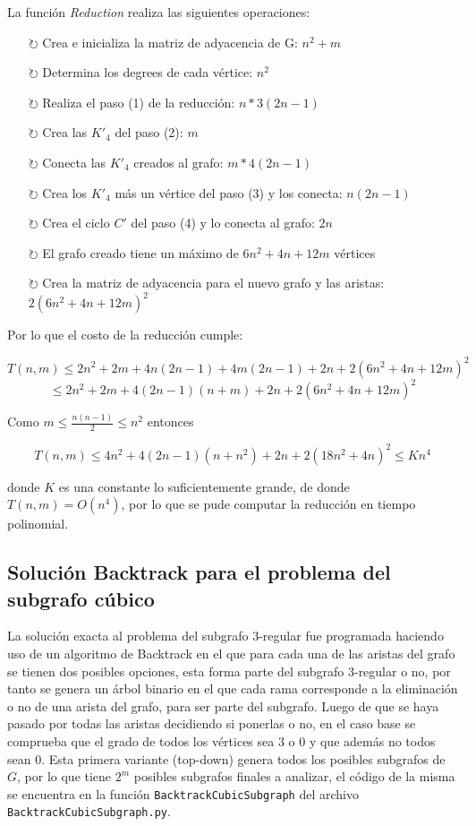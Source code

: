 \documentclass{article}
\begin{document}
La funci\'on \textit{Reduction} realiza las siguientes operaciones: 

\begin{itemize}
    \item[$\circlearrowright $] Crea e inicializa la matriz de adyacencia de G: $n^2 + m$
    \item[$\circlearrowright $] Determina los degrees de cada v\'ertice: $n^2$
    \item[$\circlearrowright $] Realiza el paso (1) de la reducci\'on: $n * 3(2n-1)$
    \item[$\circlearrowright $] Crea las $K'_4$ del paso (2): $m$
    \item[$\circlearrowright $] Conecta las $K'_4$ creados al grafo: $m * 4(2n-1)$
    \item[$\circlearrowright $] Crea los $K'_4$ m\'as un v\'ertice del paso (3) y los conecta: $n(2n -1) $
    \item[$\circlearrowright $] Crea el ciclo $C'$ del paso (4) y lo conecta al grafo: $2n$
    \item[$\circlearrowright $] El grafo creado tiene un m\'aximo de $6n^2 + 4n + 12m$ v\'ertices
    \item[$\circlearrowright $] Crea la matriz de adyacencia para el nuevo grafo y las aristas: $2(6n^2 + 4n + 12m)^2$
\end{itemize}

Por lo que el costo de la reducci\'on cumple:

$$T(n,m) \leq 2n^2 + 2m + 4n(2n-1) + 4m(2n-1) + 2n + 2(6n^2 + 4n + 12m)^2$$
$$\leq 2n^2 + 2m + 4(2n-1)(n+m) + 2n + 2(6n^2 + 4n + 12m)^2$$

Como $m \leq \frac{n(n-1)}{2} \leq n^2$ entonces

$$T(n,m) \leq 4n^2 + 4(2n-1)(n+n^2) + 2n + 2(18n^2 + 4n)^2 \leq Kn^4$$ 

donde $K$ es una constante lo suficientemente grande, de donde $T(n,m) = O(n^4)$, por lo 
que se pude computar la reducci\'on en tiempo polinomial.

\subsection*{Soluci\'on Backtrack para el problema del subgrafo c\'ubico}
La soluci\'on exacta al problema del subgrafo $3$-regular fue programada haciendo uso de un algoritmo de Backtrack en el que para cada una de las aristas del grafo se tienen 
dos posibles opciones, esta forma parte del subgrafo $3$-regular o no, por tanto se genera un \'arbol binario en el que cada rama corresponde a la eliminaci\'on o no de una arista
del grafo, para ser parte del subgrafo. Luego de que se haya pasado por todas las aristas decidiendo si ponerlas o no, en el caso base se comprueba que el grado de todos los v\'ertices sea $3$ o $0$
y que adem\'as no todos sean $0$. Esta primera variante (top-down) genera todos los posibles subgrafos de $G$, por lo que tiene $2^m$ posibles subgrafos finales a analizar, el c\'odigo de la misma se encuentra
en la funci\'on \texttt{BacktrackCubicSubgraph} del archivo \texttt{BacktrackCubicSubgraph.py}.\\ 
\end{document}
